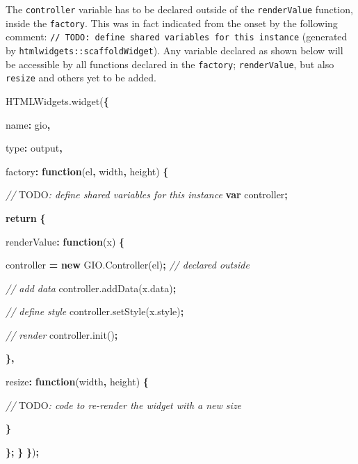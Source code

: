 \documentclass[
  10pt,
]{krantz}
\makeatletter
\newenvironment{Shaded}{\begin{snugshade}}{\end{snugshade}}
\newcommand{\AlertTok}[1]{\textcolor[rgb]{0.33,0.33,0.33}{#1}}
\newcommand{\AttributeTok}[1]{\textcolor[rgb]{0.61,0.61,0.61}{#1}}
\newcommand{\CommentTok}[1]{\textcolor[rgb]{0.37,0.37,0.37}{\textit{#1}}}
\newcommand{\ControlFlowTok}[1]{\textcolor[rgb]{0.27,0.27,0.27}{\textbf{#1}}}
\newcommand{\DataTypeTok}[1]{\textcolor[rgb]{0.27,0.27,0.27}{#1}}
\newcommand{\KeywordTok}[1]{\textcolor[rgb]{0.27,0.27,0.27}{\textbf{#1}}}
\newcommand{\NormalTok}[1]{#1}
\newcommand{\OperatorTok}[1]{\textcolor[rgb]{0.43,0.43,0.43}{\textbf{#1}}}
\newcommand{\StringTok}[1]{\textcolor[rgb]{0.5,0.5,0.5}{#1}}
\newcommand{\VariableTok}[1]{\textcolor[rgb]{0,0,0}{#1}}
\newenvironment{kframe}{%
\medskip{}
\setlength{\fboxsep}{.8em}
 \def\at@end@of@kframe{}%
 \ifinner\ifhmode%
  \def\at@end@of@kframe{\end{minipage}}%
  \begin{minipage}{\columnwidth}%
 \fi\fi%
 \def\FrameCommand##1{\hskip\@totalleftmargin \hskip-\fboxsep
 \colorbox{shadecolor}{##1}\hskip-\fboxsep
     \hskip-\linewidth \hskip-\@totalleftmargin \hskip\columnwidth}%
 \MakeFramed {\advance\hsize-\width
   \@totalleftmargin\z@ \linewidth\hsize
   \@setminipage}}%
 {\par\unskip\endMakeFramed%
 \at@end@of@kframe}
\renewenvironment{Shaded}{\begin{kframe}}{\end{kframe}}
\makeatother
\begin{document}
The \texttt{controller} variable has to be declared outside of the \texttt{renderValue} function, inside the \texttt{factory}. This was in fact indicated from the onset by the following comment: \texttt{//\ TODO:\ define\ shared\ variables\ for\ this\ instance} (generated by \texttt{htmlwidgets::scaffoldWidget}). Any variable declared as shown below will be accessible by all functions declared in the \texttt{factory}; \texttt{renderValue}, but also \texttt{resize} and others yet to be added.

\begin{Shaded}
\begin{Highlighting}[]
\VariableTok{HTMLWidgets}\NormalTok{.}\AttributeTok{widget}\NormalTok{(}\OperatorTok{\{}

  \DataTypeTok{name}\OperatorTok{:} \StringTok{\textquotesingle{}gio\textquotesingle{}}\OperatorTok{,}

  \DataTypeTok{type}\OperatorTok{:} \StringTok{\textquotesingle{}output\textquotesingle{}}\OperatorTok{,}

  \DataTypeTok{factory}\OperatorTok{:} \KeywordTok{function}\NormalTok{(el}\OperatorTok{,}\NormalTok{ width}\OperatorTok{,}\NormalTok{ height) }\OperatorTok{\{}

    \CommentTok{// }\AlertTok{TODO}\CommentTok{: define shared variables for this instance}
    \KeywordTok{var}\NormalTok{ controller}\OperatorTok{;}

    \ControlFlowTok{return} \OperatorTok{\{}

      \DataTypeTok{renderValue}\OperatorTok{:} \KeywordTok{function}\NormalTok{(x) }\OperatorTok{\{}

\NormalTok{        controller }\OperatorTok{=} \KeywordTok{new} \VariableTok{GIO}\NormalTok{.}\AttributeTok{Controller}\NormalTok{(el)}\OperatorTok{;} \CommentTok{// declared outside}
        
        \CommentTok{// add data}
        \VariableTok{controller}\NormalTok{.}\AttributeTok{addData}\NormalTok{(}\VariableTok{x}\NormalTok{.}\AttributeTok{data}\NormalTok{)}\OperatorTok{;}

        \CommentTok{// define style}
        \VariableTok{controller}\NormalTok{.}\AttributeTok{setStyle}\NormalTok{(}\VariableTok{x}\NormalTok{.}\AttributeTok{style}\NormalTok{)}\OperatorTok{;}

        \CommentTok{// render}
        \VariableTok{controller}\NormalTok{.}\AttributeTok{init}\NormalTok{()}\OperatorTok{;}

      \OperatorTok{\},}

      \DataTypeTok{resize}\OperatorTok{:} \KeywordTok{function}\NormalTok{(width}\OperatorTok{,}\NormalTok{ height) }\OperatorTok{\{}

        \CommentTok{// }\AlertTok{TODO}\CommentTok{: code to re{-}render the widget with a new size}

      \OperatorTok{\}}

    \OperatorTok{\};}
  \OperatorTok{\}}
\OperatorTok{\}}\NormalTok{)}\OperatorTok{;}
\end{Highlighting}
\end{Shaded}
\end{document}
